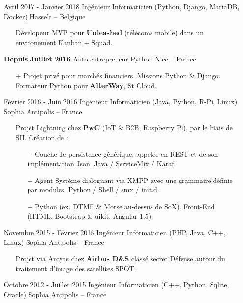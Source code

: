 \documentclass{res}
\begin{document}
\begin{resume}
\begin{itemize}
\begin{itemize}
\begin{itemize}
			\end{itemize}
		\end{itemize}
		\item[] Avril 2017 - Janvier 2018 \tabto{5cm} Ing\'enieur Informaticien (Python, Django, MariaDB, Docker) \hfill Hasselt -- Belgique
		\begin{itemize}
			\item[] D\'evelopeur MVP pour \textbf{Unleashed} (t\'el\'ecoms mobile) dans un environement Kanban + Squad.
		\end{itemize}
		\item[] \textbf{Depuis Juillet 2016} \tabto{5cm} Auto-entrepreneur Python \hfill Nice -- France
		\begin{itemize}
			\item[+] Projet priv\'e pour march\'es financiers. Missions Python \& Django. Formateur Python pour \textbf{AlterWay}, St Cloud.
		\end{itemize}
		\item[] F\'evrier 2016 - Juin 2016 \tabto{5cm} Ing\'enieur Informaticien (Java, Python, R-Pi, Linux) \hfill Sophia Antipolis -- France
		\begin{itemize}
			\item[] Projet Lightning chez \textbf{PwC} (IoT \& B2B, Raspberry Pi), par le biais de SII. Cr\'eation de :
			\begin{itemize}
				\item[+] Couche de persistence g\'en\'erique, appel\'ee en REST et de son impl\'ementation Json. Java / ServiceMix / Karaf.
				\item[+] Agent Syst\`eme dialoguant via XMPP avec une grammaire d\'efinie par modules. Python / Shell / smx / init.d.
				\item[+] Python (ex. DTMF \& Morse au-dessus de SoX). Front-End (HTML, Bootstrap \& uikit, Angular 1.5).
			\end{itemize}
		\end{itemize}
		\item[] Novembre 2015 - F\'evrier 2016 \tabto{5cm} Ing\'enieur Informaticien (PHP, Java, C++, Linux) \hfill Sophia Antipolis -- France
		\begin{itemize}
			\item[] Projet via Antyas chez \textbf{Airbus D\&S} class\'e secret D\'efense autour du traitement d'image des satellites SPOT.
		\end{itemize}
		\item[] Octobre 2012 - Juillet 2015 \tabto{5cm} Ing\'enieur Informaticien (C++, Python, Sqlite, Oracle)  \hfill Sophia Antipolis -- France

\end{itemize}
\end{resume}
\end{document}
